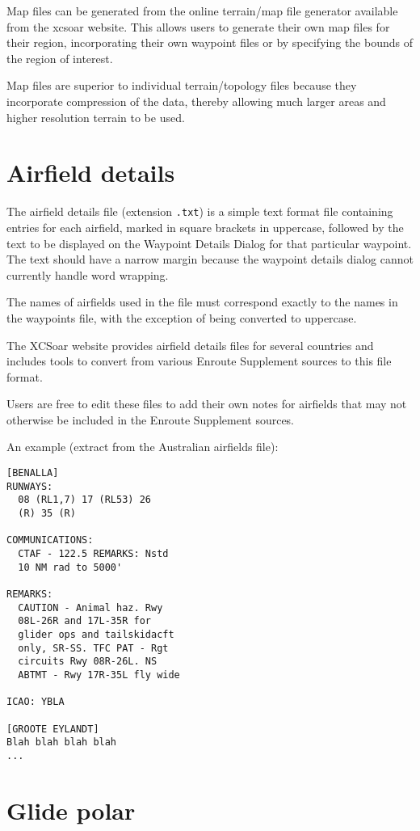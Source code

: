 Map files can be generated from the online terrain/map file generator
available from the xcsoar website.  This allows users to generate
their own map files for their region, incorporating their own waypoint
files or by specifying the bounds of the region of interest.

Map files are superior to individual terrain/topology files because
they incorporate compression of the data, thereby allowing much larger
areas and higher resolution terrain to be used.

\section{Airfield details}

The airfield details file (extension \verb|.txt|) is a simple text
format file containing entries for each airfield, marked in square
brackets in uppercase, followed by the text to be displayed on the
Waypoint Details Dialog for that particular waypoint.  The text should
have a narrow margin because the waypoint details dialog cannot
currently handle word wrapping.

The names of airfields used in the file must correspond exactly to the
names in the waypoints file, with the exception of being converted to
uppercase.

The XCSoar website provides airfield details files for several
countries and includes tools to convert from various Enroute
Supplement sources to this file format.

Users are free to edit these files to add their own notes for
airfields that may not otherwise be included in the Enroute Supplement
sources.

An example (extract from the Australian airfields file):
\begin{verbatim}
[BENALLA]
RUNWAYS:
  08 (RL1,7) 17 (RL53) 26
  (R) 35 (R)

COMMUNICATIONS:
  CTAF - 122.5 REMARKS: Nstd
  10 NM rad to 5000'

REMARKS:
  CAUTION - Animal haz. Rwy
  08L-26R and 17L-35R for
  glider ops and tailskidacft
  only, SR-SS. TFC PAT - Rgt
  circuits Rwy 08R-26L. NS
  ABTMT - Rwy 17R-35L fly wide

ICAO: YBLA

[GROOTE EYLANDT]
Blah blah blah blah
...
\end{verbatim}

\section{Glide polar}


